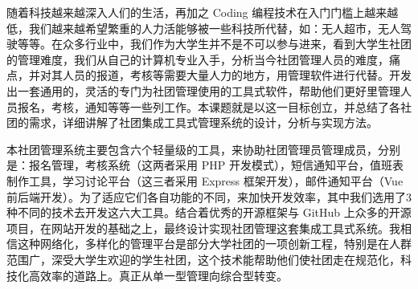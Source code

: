 \begin{cabstract}

随着科技越来越深入人们的生活，再加之 Coding 编程技术在入门门槛上越来越低，我们越来越希望繁重的人力活能够被一些科技所代替，如：无人超市，无人驾驶等等。在众多行业中，我们作为大学生并不是不可以参与进来，看到大学生社团的管理难度，我们从自己的计算机专业入手，分析当今社团管理人员的难度，痛点，并对其人员的报道，考核等需要大量人力的地方，用管理软件进行代替。开发出一套通用的，灵活的专门为社团管理使用的工具式软件，帮助他们更好里管理人员报名，考核，通知等等一些列工作。本课题就是以这一目标创立，并总结了各社团的需求，详细讲解了社团集成工具式管理系统的设计，分析与实现方法。

本社团管理系统主要包含六个轻量级的工具，来协助社团管理员管理成员，分别是：报名管理，考核系统（这两者采用 PHP 开发模式），短信通知平台，值班表制作工具，学习讨论平台（这三者采用 Express 框架开发），邮件通知平台（Vue 前后端开发）。为了适应它们各自功能的不同，来加快开发效率，其中我们选用了3种不同的技术去开发这六大工具。结合着优秀的开源框架与 GitHub 上众多的开源项目，在网站开发的基础之上，最终设计实现社团管理这套集成工具式系统。我相信这种网络化，多样化的管理平台是部分大学社团的一项创新工程，特别是在人群范围广，深受大学生欢迎的学生社团，这个技术能帮助他们使社团走在规范化，科技化高效率的道路上。真正从单一型管理向综合型转变。


\end{cabstract}

